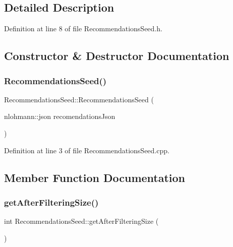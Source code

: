 \subsection{Detailed Description}


Definition at line 8 of file Recommendations\+Seed.\+h.



\subsection{Constructor \& Destructor Documentation}
\mbox{\label{class_recommendations_seed_a9e207c7f524d52dea0941721469913d4}} 
\subsubsection{\texorpdfstring{Recommendations\+Seed()}{RecommendationsSeed()}}
{\footnotesize\ttfamily Recommendations\+Seed\+::\+Recommendations\+Seed (\begin{DoxyParamCaption}\item[{nlohmann\+::json}]{recomendations\+Json }\end{DoxyParamCaption})}



Definition at line 3 of file Recommendations\+Seed.\+cpp.



\subsection{Member Function Documentation}
\mbox{\label{class_recommendations_seed_a9241776384a2751f3c9bd84b932579b6}} 
\subsubsection{\texorpdfstring{get\+After\+Filtering\+Size()}{getAfterFilteringSize()}}
{\footnotesize\ttfamily int Recommendations\+Seed\+::get\+After\+Filtering\+Size (\begin{DoxyParamCaption}{ }\end{DoxyParamCaption})}



